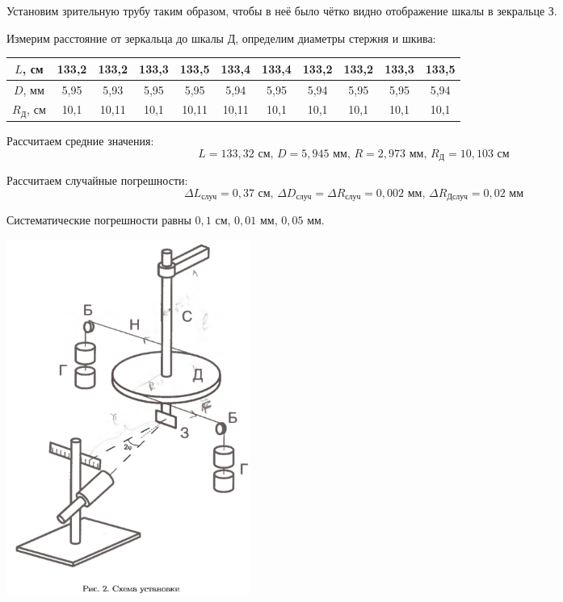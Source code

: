 \documentclass[a4paper, 12pt]{article} %
\begin{document}
Установим зрительную трубу таким образом, чтобы в неё было чётко видно отображение шкалы в зекральце З. 

Измерим расстояние от зеркальца до шкалы Д, определим диаметры стержня и шкива:
\begin{center}
\begin{tabular}{|c|c|c|c|c|c|c|c|c|c|c|}
\hline 
$L$, см & 133,2 & 133,2 & 133,3 & 133,5 & 133,4 & 133,4 & 133,2 & 133,2 & 133,3 & 133,5 \\ 
\hline 
$D$, мм & 5,95 & 5,93 & 5,95 & 5,95 & 5,94 & 5,95 & 5,94 & 5,95 & 5,95 & 5,94 \\ 
\hline 
$R_{\text{Д}}$, см & 10,1 & 10,11 & 10,1 & 10,11 & 10,11 & 10,1 & 10,1 & 10,1 & 10,1 & 10,1 \\ 
\hline 
\end{tabular}
\end{center} 

Рассчитаем средние значения:
\[L = 133,32\text{ см, }D = 5,945\text{ мм, }R = 2,973\text{ мм, }R_{\text{Д}} = 10,103\text{ см}\]

Рассчитаем случайные погрешности:
\[\Delta L_{\text{случ}} = 0,37\text{ см, }\Delta D_{\text{случ}} = \Delta R_{\text{случ}} = 0,002\text{ мм, }\Delta R_{\text{Дслуч}} = 0,02\text{ мм}\]

Систематические погрешности равны $0,1$ см, $0,01$ мм, $0,05$ мм.

\begin{center}
	{\includegraphics[width=8cm]{2}}
\end{center} 
\end{document}
